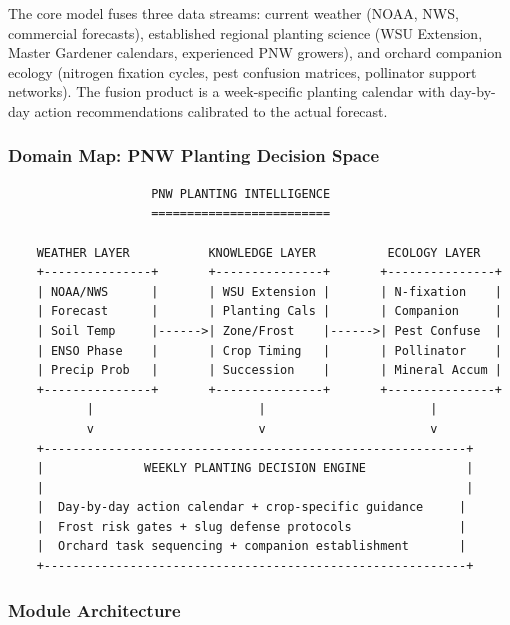 \documentclass[11pt,letterpaper]{article}
\begin{document}
The core model fuses three data streams: current weather (NOAA, NWS, commercial forecasts), established regional planting science (WSU Extension, Master Gardener calendars, experienced PNW growers), and orchard companion ecology (nitrogen fixation cycles, pest confusion matrices, pollinator support networks). The fusion product is a week-specific planting calendar with day-by-day action recommendations calibrated to the actual forecast.

\subsubsection{Domain Map: PNW Planting Decision Space}

\begin{asciibox}
\begin{verbatim}
                    PNW PLANTING INTELLIGENCE
                    =========================

    WEATHER LAYER           KNOWLEDGE LAYER          ECOLOGY LAYER
    +---------------+       +---------------+       +---------------+
    | NOAA/NWS      |       | WSU Extension |       | N-fixation    |
    | Forecast      |       | Planting Cals |       | Companion     |
    | Soil Temp     |------>| Zone/Frost    |------>| Pest Confuse  |
    | ENSO Phase    |       | Crop Timing   |       | Pollinator    |
    | Precip Prob   |       | Succession    |       | Mineral Accum |
    +---------------+       +---------------+       +---------------+
           |                       |                       |
           v                       v                       v
    +-----------------------------------------------------------+
    |              WEEKLY PLANTING DECISION ENGINE              |
    |                                                           |
    |  Day-by-day action calendar + crop-specific guidance     |
    |  Frost risk gates + slug defense protocols               |
    |  Orchard task sequencing + companion establishment       |
    +-----------------------------------------------------------+
\end{verbatim}
\end{asciibox}

\subsubsection{Module Architecture}
\end{document}
